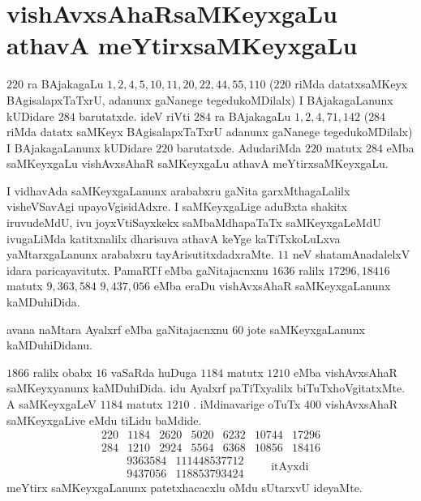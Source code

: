 \chapter{vishAvxsAhaRsaMKeyxgaLu athavA meYtirxsaMKeyxgaLu}
\vskip -20pt

$220$ ra BAjakagaLu $1,2,4,5,10,11,20,22,44,55,110$ ($220$ riMda datatxsaMKeyx BAgisalapxTaTxrU, adanunx gaNanege tegedukoMDilalx) I BAjakagaLanunx kUDidare $284$ barutatxde. ideV riVti $284$ ra BAjakagaLu $1,2,4,71,142$ ($284$ riMda datatx saMKeyx BAgisalapxTaTxrU adanunx gaNanege tegedukoMDilalx) I BAjakagaLanunx kUDidare $220$ barutatxde. AdudariMda $220$ matutx $284$ eMba saMKeyxgaLu vishAvxsAhaR saMKeyxgaLu athavA meYtirxsaMKeyxgaLu.

I vidhavAda saMKeyxgaLanunx arababxru gaNita garxMthagaLalilx visheVSavAgi upa\-yoVgisidAdxre. I saMKeyxgaLige aduBxta shakitx iruvudeMdU, ivu joyxVtiSayxkekx saMbaMdhapaTaTx saMKeyxgaLeMdU ivugaLiMda katitxnalilx dharisuva athavA keYge kaTiTxkoLuLxva yaMtarxgaLanunx arababxru tayArisutitxdadxraMte. $11$ neV shatamAnadalelxV idara pari\-cayavitutx. PamaRTf eMba gaNitajacnxnu $1636$ ralilx $17296, 18416$ matutx $9,363,584$  $9,437,056$  eMba eraDu vishAvxsAhaR saMKeyxgaLanunx kaMDuhiDida.

avana naMtara Ayalxrf eMba gaNitajacnxnu $60$ jote saMKeyxgaLanunx kaMDuhiDidanu.

$1866$ ralilx obabx $16$ vaSaRda huDuga $1184$ matutx $1210$ eMba vishAvxsAhaR saMKeyxyanunx kaMDuhiDida. idu Ayalxrf paTiTxyalilx biTuTxhoVgitatxMte. A saMKeyxgaLeV $1184$ matutx $1210$ . iMdinavarige oTuTx $400$ vishAvxsAhaR saMKeyxgaLive eMdu tiLidu baMdide. 
{\fontsize{10}{12}\selectfont
$$
\begin{matrix}
220 & 1184 & 2620 & 5020 & 6232 & 10744 & 17296\\ 
284 & 1210 & 2924 & 5564 & 6368 & 10856 & 18416 
\end{matrix}
$$
$$
\begin{matrix}
& 9363584 & 111448537712 \\
& 9437056 & 118853793424 
\end{matrix}
\qquad \text{itAyxdi} 
$$}
meYtirx saMKeyxgaLanunx patetxhacacxlu oMdu sUtarxvU ideyaMte.
